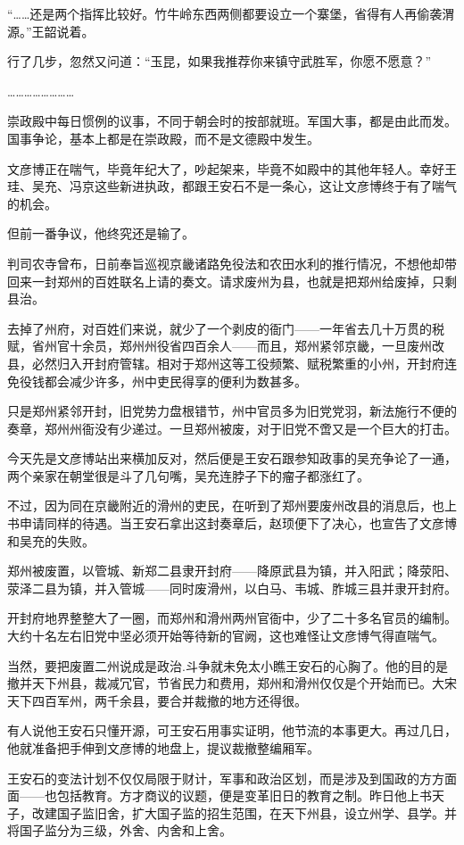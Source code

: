 “……还是两个指挥比较好。竹牛岭东西两侧都要设立一个寨堡，省得有人再偷袭渭源。”王韶说着。

行了几步，忽然又问道：“玉昆，如果我推荐你来镇守武胜军，你愿不愿意？”

……………………

崇政殿中每日惯例的议事，不同于朝会时的按部就班。军国大事，都是由此而发。国事争论，基本上都是在崇政殿，而不是文德殿中发生。

文彦博正在喘气，毕竟年纪大了，吵起架来，毕竟不如殿中的其他年轻人。幸好王珪、吴充、冯京这些新进执政，都跟王安石不是一条心，这让文彦博终于有了喘气的机会。

但前一番争议，他终究还是输了。

判司农寺曾布，日前奉旨巡视京畿诸路免役法和农田水利的推行情况，不想他却带回来一封郑州的百姓联名上请的奏文。请求废州为县，也就是把郑州给废掉，只剩县治。

去掉了州府，对百姓们来说，就少了一个剥皮的衙门——一年省去几十万贯的税赋，省州官十余员，郑州州役省四百余人——而且，郑州紧邻京畿，一旦废州改县，必然归入开封府管辖。相对于郑州这等工役频繁、赋税繁重的小州，开封府连免役钱都会减少许多，州中吏民得享的便利为数甚多。

只是郑州紧邻开封，旧党势力盘根错节，州中官员多为旧党党羽，新法施行不便的奏章，郑州州衙没有少递过。一旦郑州被废，对于旧党不啻又是一个巨大的打击。

今天先是文彦博站出来横加反对，然后便是王安石跟参知政事的吴充争论了一通，两个亲家在朝堂很是斗了几句嘴，吴充连脖子下的瘤子都涨红了。

不过，因为同在京畿附近的滑州的吏民，在听到了郑州要废州改县的消息后，也上书申请同样的待遇。当王安石拿出这封奏章后，赵顼便下了决心，也宣告了文彦博和吴充的失败。

郑州被废置，以管城、新郑二县隶开封府——降原武县为镇，并入阳武；降荥阳、荥泽二县为镇，并入管城——同时废滑州，以白马、韦城、胙城三县并隶开封府。

开封府地界整整大了一圈，而郑州和滑州两州官衙中，少了二十多名官员的编制。大约十名左右旧党中坚必须开始等待新的官阙，这也难怪让文彦博气得直喘气。

当然，要把废置二州说成是政治.斗争就未免太小瞧王安石的心胸了。他的目的是撤并天下州县，裁减冗官，节省民力和费用，郑州和滑州仅仅是个开始而已。大宋天下四百军州，两千余县，要合并裁撤的地方还得很。

有人说他王安石只懂开源，可王安石用事实证明，他节流的本事更大。再过几日，他就准备把手伸到文彦博的地盘上，提议裁撤整编厢军。

王安石的变法计划不仅仅局限于财计，军事和政治区划，而是涉及到国政的方方面面——也包括教育。方才商议的议题，便是变革旧日的教育之制。昨日他上书天子，改建国子监旧舍，扩大国子监的招生范围，在天下州县，设立州学、县学。并将国子监分为三级，外舍、内舍和上舍。

